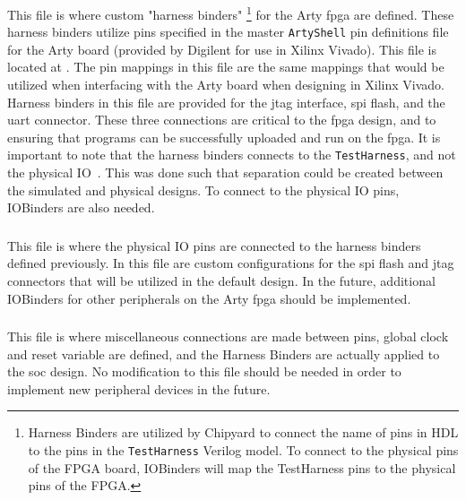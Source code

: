 \subsubsection{}\label{sec:Customizing_FPGA-HarnessBinders.scala}
This file is where custom "harness binders"
\footnote{Harness Binders are utilized by Chipyard to connect the name of pins in HDL to the pins in the \texttt{TestHarness} Verilog model. To connect to the physical pins of the FPGA board, IOBinders will map the TestHarness pins to the physical pins of the FPGA.}
 for the Arty \Gls{fpga} are defined.
These harness binders utilize pins specified in the master \texttt{ArtyShell} pin definitions file for the Arty board (provided by Digilent for use in Xilinx Vivado).
This file is located at .
The pin mappings in this file are the same mappings that would be utilized when interfacing with the Arty board when designing in Xilinx Vivado.
Harness binders in this file are provided for the \Gls{jtag} interface, \Gls{spi} flash, and the \Gls{uart}  connector.
These three connections are critical to the \Gls{fpga} design, and to ensuring that programs can be successfully uploaded and run on the \Gls{fpga}.
It is important to note that the harness binders connects to the \texttt{TestHarness}, and not the physical IO~\cite{Chipyard_IO}.
This was done such that separation could be created between the simulated and physical designs.
To connect to the physical IO pins, IOBinders are also needed.

\subsubsection{}\label{sec:Customizing_FPGA-IOBinders.scala}
This file is where the physical IO pins are connected to the harness binders defined previously.
In this file are custom configurations for the \Gls{spi} flash and \Gls{jtag} connectors that will be utilized in the default design.
In the future, additional IOBinders for other peripherals on the Arty \Gls{fpga} should be implemented.

\subsubsection{}\label{sec:Customizing_FPGA-TestHarness.scala}
This file is where miscellaneous connections are made between pins, global clock and reset variable are defined, and the Harness Binders are actually applied to the \Gls{soc} design.
No modification to this file should be needed in order to implement new peripheral devices in the future.

